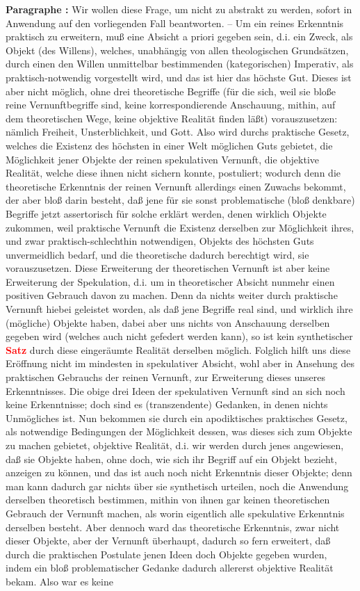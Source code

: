 \documentclass[a4paper,12pt,twoside]{book}
\newcommand{\match}[1]{\textcolor{red}{\textbf{#1}}}
\begin{document}
	\noindent\textbf{Paragraphe : }Wir wollen diese Frage, um nicht zu abstrakt zu werden, sofort in Anwendung auf den vorliegenden Fall beantworten. – Um ein reines Erkenntnis praktisch zu erweitern, muß eine Absicht a priori gegeben sein, d.i. ein Zweck, als Objekt (des Willens), welches, unabhängig von allen theologischen Grundsätzen, durch einen den Willen unmittelbar bestimmenden (kategorischen) Imperativ, als praktisch-notwendig vorgestellt wird, und das ist hier das höchste Gut. Dieses ist aber nicht möglich, ohne drei theoretische Begriffe (für die sich, weil sie bloße reine Vernunftbegriffe sind, keine korrespondierende Anschauung, mithin, auf dem theoretischen Wege, keine objektive Realität finden läßt) vorauszusetzen: nämlich Freiheit, Unsterblichkeit, und Gott. Also wird durchs praktische Gesetz, welches die Existenz des höchsten in einer Welt möglichen Guts gebietet,  die Möglichkeit jener Objekte der reinen spekulativen Vernunft, die objektive Realität, welche diese ihnen nicht sichern konnte, postuliert; wodurch denn die theoretische Erkenntnis der reinen Vernunft allerdings einen Zuwachs bekommt, der aber bloß darin besteht, daß jene für sie sonst problematische (bloß denkbare) Begriffe jetzt assertorisch für solche erklärt werden, denen wirklich Objekte zukommen, weil praktische Vernunft die Existenz derselben zur Möglichkeit ihres, und zwar praktisch-schlechthin notwendigen, Objekts des höchsten Guts unvermeidlich bedarf, und die theoretische dadurch berechtigt wird, sie vorauszusetzen. Diese Erweiterung der theoretischen Vernunft ist aber keine Erweiterung der Spekulation, d.i. um in theoretischer Absicht nunmehr einen positiven Gebrauch davon zu machen. Denn da nichts weiter durch praktische Vernunft hiebei geleistet worden, als daß jene Begriffe real sind, und wirklich ihre (mögliche) Objekte haben, dabei aber uns nichts von Anschauung derselben gegeben wird (welches auch nicht gefedert werden kann), so ist kein synthetischer \match{Satz} durch diese eingeräumte Realität derselben möglich. Folglich hilft uns diese Eröffnung nicht im mindesten in spekulativer Absicht, wohl aber in Ansehung des praktischen Gebrauchs der reinen Vernunft, zur Erweiterung dieses unseres Erkenntnisses. Die obige drei Ideen der spekulativen Vernunft sind an sich noch keine Erkenntnisse; doch sind es (transzendente) Gedanken, in denen nichts Unmögliches ist. Nun bekommen sie durch ein apodiktisches praktisches Gesetz, als notwendige Bedingungen der Möglichkeit dessen, was dieses sich zum Objekte zu machen gebietet, objektive Realität, d.i. wir werden durch jenes angewiesen, daß sie Objekte haben, ohne doch, wie sich ihr Begriff auf ein Objekt bezieht, anzeigen zu können, und das ist auch noch nicht Erkenntnis dieser Objekte; denn man kann dadurch gar nichts über sie synthetisch urteilen, noch die Anwendung derselben theoretisch bestimmen, mithin von ihnen gar keinen theoretischen Gebrauch der Vernunft machen, als worin eigentlich alle spekulative Erkenntnis derselben besteht. Aber dennoch ward das  theoretische Erkenntnis, zwar nicht dieser Objekte, aber der Vernunft überhaupt, dadurch so fern erweitert, daß durch die praktischen Postulate jenen Ideen doch Objekte gegeben wurden, indem ein bloß problematischer Gedanke dadurch allererst objektive Realität bekam. Also war es keine 
\end{document}
